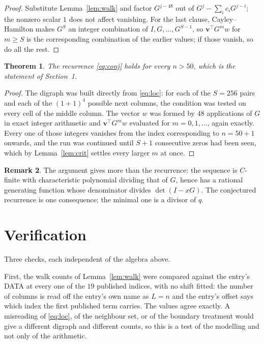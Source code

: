 \documentclass[11pt,a4paper]{article}
\theoremstyle{plain}
\newtheorem{theorem}{Theorem}
\theoremstyle{definition}
\newtheorem{remark}[theorem]{Remark}
\begin{document}
\begin{proof}
Substitute Lemma~\ref{lem:walk} and factor $G^{j-48}$ out of
$G^{j}-\sum_ic_iG^{j-i}$; the nonzero scalar $1$ does not affect
vanishing. For the last clause, Cayley--Hamilton makes $G^{S}$ an integer combination of
$I,G,\dots,G^{S-1}$, so $\mathbf{v}^{\!\top}G^{m}w$ for $m\ge S$ is the corresponding
combination of the earlier values; if those vanish, so do all the rest.
\end{proof}

\begin{theorem}
The recurrence \eqref{eq:conj} holds for every $n>50$, which is the statement of
Section~1.
\end{theorem}

\begin{proof}
The digraph was built directly from \eqref{eq:loc}: for each of the $S=256$ pairs and each
of the $(1+1)^{4}$ possible next columns, the condition was tested on every cell of
the middle column. The vector $w$ was formed by $48$ applications of $G$ in exact integer
arithmetic and $\mathbf{v}^{\!\top}G^{m}w$ evaluated for $m=0,1,\dots$, again exactly.
Every one of those integers vanishes from the index corresponding to $n=50+1$ onwards,
and the run was continued until $S+1$ consecutive zeros had been seen, which by
Lemma~\ref{lem:crit} settles every larger $m$ at once.
\end{proof}

\begin{remark}
The argument gives more than the recurrence: the sequence is $C$-finite with characteristic
polynomial dividing that of $G$, hence has a rational generating function whose denominator
divides $\det(I-xG)$. The conjectured recurrence is one consequence; the minimal one is a
divisor of $q$.
\end{remark}

\section{Verification}

Three checks, each independent of the algebra above.

First, the walk counts of Lemma~\ref{lem:walk} were compared against the entry's DATA at
every one of the $19$ published indices, with no shift fitted: the number of columns is
read off the entry's own name as $L=n$ and the entry's offset says which index the first
published term carries. The values agree exactly. A misreading of \eqref{eq:loc}, of the
neighbour set, or of the boundary treatment would give a different digraph and different
counts, so this is a test of the modelling and not only of the arithmetic.
\end{document}
